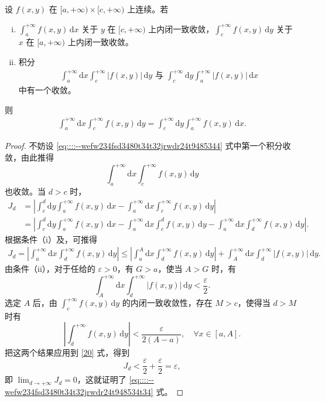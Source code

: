\documentclass[../../main.tex]{subfiles}%
\begin{document}
\begin{theorem}
设 \( f(x,y) \) 在 \( [a, +\infty) \times [c, +\infty) \) 上连续。若
\begin{enumerate}[(i)]
\item \( \int_{a}^{+\infty} f(x,y) \, \mathrm{d}x \) 关于 \( y \) 在 \( [c, +\infty) \) 上内闭一致收敛，\( \int_{c}^{+\infty} f(x,y) \, \mathrm{d}y \) 关于 \( x \) 在 \( [a, +\infty) \) 上内闭一致收敛。

\item 积分
\begin{align}\label{eq::::--wefw234fsd3480t34t32jrwdr24t9485344}
\int_{a}^{+\infty} \mathrm{d}x \int_{c}^{+\infty} |f(x,y)| \, \mathrm{d}y \text{ 与 } \int_{c}^{+\infty} \mathrm{d}y \int_{a}^{+\infty} |f(x,y)| \, \mathrm{d}x
\end{align}
中有一个收敛。
\end{enumerate}
则
\begin{align}\label{eq::::--wefw234fsd3480t34t32jrwdr24t948534t34}
\int_{a}^{+\infty} \mathrm{d}x \int_{c}^{+\infty} f(x,y) \, \mathrm{d}y = \int_{c}^{+\infty} \mathrm{d}y \int_{a}^{+\infty} f(x,y) \, \mathrm{d}x.
\end{align}
\end{theorem}
\begin{proof}

不妨设 \eqref{eq::::--wefw234fsd3480t34t32jrwdr24t9485344} 式中第一个积分收敛，由此推得
\[
\int_{a}^{+\infty} \mathrm{d}x \int_{c}^{+\infty} f(x,y) \, \mathrm{d}y
\]
也收敛。当 \( d > c \) 时，
\begin{align*}
J_d &= \left| \int_{c}^{d} \mathrm{d}y \int_{a}^{+\infty} f(x,y) \, \mathrm{d}x - \int_{a}^{+\infty} \mathrm{d}x \int_{c}^{+\infty} f(x,y) \, \mathrm{d}y \right| \\
&= \left| \int_{c}^{d} \mathrm{d}y \int_{a}^{+\infty} f(x,y) \, \mathrm{d}x - \int_{a}^{+\infty} \mathrm{d}x \int_{c}^{d} f(x,y) \, \mathrm{d}y - \int_{a}^{+\infty} \mathrm{d}x \int_{d}^{+\infty} f(x,y) \, \mathrm{d}y \right|.
\end{align*}
根据条件（i）及，可推得
\begin{align}\label{20}
J_d = \left| \int_{a}^{+\infty} \mathrm{d}x \int_{d}^{+\infty} f(x,y) \, \mathrm{d}y \right| \leqslant \left| \int_{a}^{A} \mathrm{d}x \int_{d}^{+\infty} f(x,y) \, \mathrm{d}y \right| + \int_{A}^{+\infty} \mathrm{d}x \int_{d}^{+\infty} |f(x,y)| \, \mathrm{d}y.
\end{align}
由条件（ii），对于任给的 \( \varepsilon > 0 \)，有 \( G > a \)，使当 \( A > G \) 时，有
\[
\int_{A}^{+\infty} \mathrm{d}x \int_{d}^{+\infty} |f(x,y)| \, \mathrm{d}y < \frac{\varepsilon}{2}.
\]
选定 \( A \) 后，由 \( \int_{c}^{+\infty} f(x,y) \, \mathrm{d}y \) 的内闭一致收敛性，存在 \( M > c \)，使得当 \( d > M \) 时有
\[
\left| \int_{d}^{+\infty} f(x,y) \, \mathrm{d}y \right| < \frac{\varepsilon}{2(A - a)}, \quad \forall x \in [a,A].
\]
把这两个结果应用到 \eqref{20} 式，得到
\[
J_d < \frac{\varepsilon}{2} + \frac{\varepsilon}{2} = \varepsilon,
\]
即 \( \lim_{d \to +\infty} J_d = 0 \)，这就证明了 \eqref{eq::::--wefw234fsd3480t34t32jrwdr24t948534t34} 式。

\end{proof}
\end{document}

